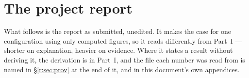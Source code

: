 \documentclass[11pt,a4paper]{report}
\begin{document}
%
\part{The project report}

What follows is the report as submitted, unedited. It makes the case for
one configuration using only computed figures, so it reads differently
from Part~I --- shorter on explanation, heavier on evidence. Where it
states a result without deriving it, the derivation is in Part~I, and the
file each number was read from is named in \S\ref{r:sec:prov} at the end
of it, and in this document's own appendices.
\end{document}
